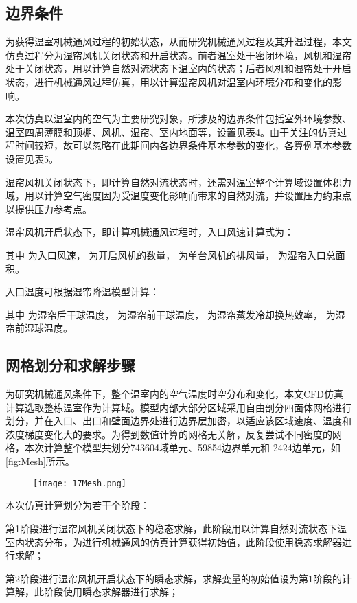 	\subsection{边界条件}
	为获得温室机械通风过程的初始状态，从而研究机械通风过程及其升温过程，本文仿真过程分为湿帘风机关闭状态和开启状态。前者温室处于密闭环境，风机和湿帘处于关闭状态，用以计算自然对流状态下温室内的状态；后者风机和湿帘处于开启状态，进行机械通风过程仿真，用以计算湿帘风机对温室内环境分布和变化的影响。
	
本次仿真以温室内的空气为主要研究对象，所涉及的边界条件包括室外环境参数、温室四周薄膜和顶棚、风机、湿帘、室内地面等，设置见表4。由于关注的仿真过程时间较短，故可以忽略在此期间内各边界条件基本参数的变化，各算例基本参数设置见表5。

湿帘风机关闭状态下，即计算自然对流状态时，还需对温室整个计算域设置体积力域，用以计算空气密度因为受温度变化影响而带来的自然对流，并设置压力约束点以提供压力参考点。

湿帘风机开启状态下，即计算机械通风过程时，入口风速计算式为：

其中 为入口风速， 为开启风机的数量， 为单台风机的排风量， 为湿帘入口总面积。

入口温度可根据湿帘降温模型计算：

其中 为湿帘后干球温度， 为湿帘前干球温度， 为湿帘蒸发冷却换热效率， 为湿帘前湿球温度。

	\subsection{网格划分和求解步骤}
为研究机械通风条件下，整个温室内的空气温度时空分布和变化，本文CFD仿真计算选取整栋温室作为计算域。模型内部大部分区域采用自由剖分四面体网格进行划分，并在入口、出口和壁面边界处进行边界层加密，以适应该区域速度、温度和浓度梯度变化大的要求。为得到数值计算的网格无关解，反复尝试不同密度的网格，本次计算整个模型共划分743604域单元、59854边界单元和 2424边单元，如\ref{fig:Mesh}所示。
 	  	\begin{figure}[!htp]
  			\centering
 			\texttt{[image: 17Mesh.png]}
		\end{figure}
本次仿真计算划分为若干个阶段：

第1阶段进行湿帘风机关闭状态下的稳态求解，此阶段用以计算自然对流状态下温室内状态分布，为进行机械通风的仿真计算获得初始值，此阶段使用稳态求解器进行求解；

第2阶段进行湿帘风机开启状态下的瞬态求解，求解变量的初始值设为第1阶段的计算解，此阶段使用瞬态求解器进行求解；

